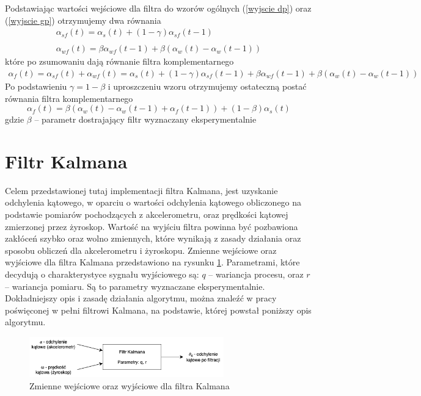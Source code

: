 Podstawiając wartości wejściowe dla filtra do wzorów ogólnych (\ref{wyjscie dp}) oraz (\ref{wyjscie gp}) otrzymujemy dwa równania
$$
    \begin{array}{cc}
        \alpha_{sf}(t) = \alpha_{s}(t) + (1 - \gamma)\alpha_{sf}(t-1) \\ \\
        \alpha_{wf}(t) = \beta \alpha_{wf}(t-1) + \beta(\alpha_w(t) - \alpha_w(t-1))
    \end{array}
$$
które po zsumowaniu dają równanie filtra komplementarnego
$$
    \begin{array}{cc}
        \alpha_f(t) = \alpha_{sf}(t) + \alpha_{wf}(t) = \alpha_{s}(t) + (1 - \gamma)\alpha_{sf}(t-1) + \beta \alpha_{wf}(t-1) + \beta(\alpha_w(t) - \alpha_w(t-1))
    \end{array}
$$
Po podstawieniu $\gamma = 1 - \beta$ i uproszczeniu wzoru otrzymujemy ostateczną postać równania filtra komplementarnego
\begin{equation}
    \alpha_f(t) = \beta(\alpha_w(t) - \alpha_w(t-1) + \alpha_f(t-1)) + (1 - \beta)\alpha_s(t)
\end{equation}
gdzie
$\beta$ -- parametr dostrajający filtr wyznaczany eksperymentalnie

\section{Filtr Kalmana}

Celem przedstawionej tutaj implementacji filtra Kalmana, jest uzyskanie odchylenia kątowego, w oparciu o wartości odchylenia kątowego obliczonego na podstawie pomiarów pochodzących z akcelerometru, oraz prędkości kątowej zmierzonej przez żyroskop. Wartość na wyjściu filtra powinna być pozbawiona zakłóceń szybko oraz wolno zmiennych, które wynikają z zasady działania oraz sposobu obliczeń dla akcelerometru i żyroskopu. Zmienne wejściowe oraz wyjściowe dla filtra Kalmana przedstawiono na rysunku \ref{Kalman idea}. Parametrami, które decydują o charakterystyce sygnału wyjściowego są: $q$ -- wariancja procesu, oraz $r$ -- wariancja pomiaru. Są to parametry wyznaczane eksperymentalnie. Dokładniejszy opis i zasadę działania algorytmu, można znaleźć w pracy \cite{Kalman} poświęconej w pełni filtrowi Kalmana, na podstawie, której powstał poniższy opis algorytmu.

\begin{figure}[h!]
    \centering
    \includegraphics[width=0.75\textwidth]{Rysunki/Rozdzial04/Kalman_idea.png}
    \caption{Zmienne wejściowe oraz wyjściowe dla filtra Kalmana}
    \label{Kalman idea}
\end{figure}

